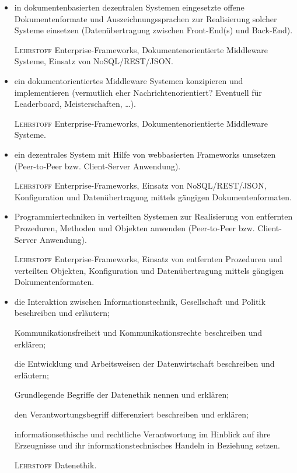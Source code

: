 \begin{itemize}[label={-}]
    \item in dokumentenbasierten dezentralen Systemen eingesetzte offene Dokumentenformate und Auszeichnungssprachen zur Realisierung solcher Systeme einsetzen
        {\color{red}(Datenübertragung zwischen Front-End(s) und Back-End)}.
    \item[\tiny\textsc{Lehrstoff}] Enterprise-Frameworks, Dokumentenorientierte Middleware Systeme, Einsatz von NoSQL/REST/JSON.\lehrstoffrule
  
    \item ein dokumentorientiertes Middleware Systemen konzipieren und implementieren
        {\color{red}(vermutlich eher Nachrichtenorientiert? Eventuell für Leaderboard, Meisterschaften, \dots)}.
    \item[\tiny\textsc{Lehrstoff}] Enterprise-Frameworks, Dokumentenorientierte Middleware Systeme.\lehrstoffrule

    \item ein dezentrales System mit Hilfe von webbasierten Frameworks umsetzen
        {\color{red}(Peer-to-Peer bzw. Client-Server Anwendung)}.
    \item[\tiny\textsc{Lehrstoff}] Enterprise-Frameworks, Einsatz von NoSQL/REST/JSON, Konfiguration und Datenübertragung mittels gängigen Dokumentenformaten.\lehrstoffrule
  
    \item Programmiertechniken in verteilten Systemen zur Realisierung von entfernten Prozeduren, Methoden und Objekten anwenden
        {\color{red}(Peer-to-Peer bzw. Client-Server Anwendung)}.
    \item[\tiny\textsc{Lehrstoff}] Enterprise-Frameworks, Einsatz von entfernten Prozeduren und verteilten Objekten, Konfiguration und Datenübertragung mittels gängigen Dokumentenformaten.
\end{itemize}

\begin{itemize}[label={-}]
    \item die Interaktion zwischen Informationstechnik, Gesellschaft und Politik beschreiben und erläutern;
    \item[] Kommunikationsfreiheit und Kommunikationsrechte beschreiben und erklären;
    \item[] die Entwicklung und Arbeitsweisen der Datenwirtschaft beschreiben und erläutern;
    \item[] Grundlegende Begriffe der Datenethik nennen und erklären;
    \item[] den Verantwortungsbegriff differenziert beschreiben und erklären;
    \item[] informationsethische und rechtliche Verantwortung im Hinblick auf ihre Erzeugnisse und ihr informationstechnisches Handeln in Beziehung setzen.
    \item[\tiny\textsc{Lehrstoff}] Datenethik.
\end{itemize}


